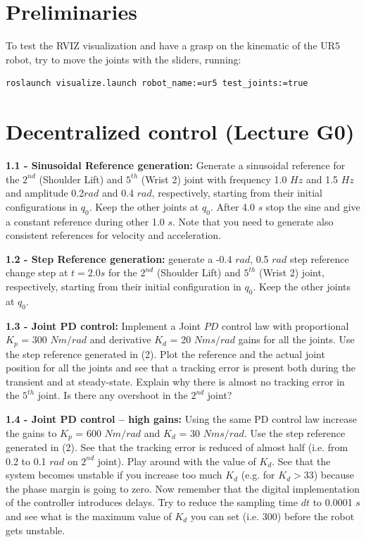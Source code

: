 \documentclass[11pt]{article}
\begin{document}
\section{Preliminaries}

To test the RVIZ visualization and have a grasp on the kinematic of the UR5 robot, try to move the joints with the sliders, running:
%
\begin{verbatim}
roslaunch visualize.launch robot_name:=ur5 test_joints:=true 
\end{verbatim}

\section{Decentralized control (Lecture G0)}

\noindent
\textbf{1.1 - Sinusoidal Reference generation:}
 Generate a sinusoidal reference for the $2^{nd}$ (Shoulder Lift) and $5^{th}$  (Wrist 2) joint with frequency 1.0 $Hz$ and 1.5 $Hz$ and amplitude 0.2$rad$ and 0.4 $rad$, respectively,  starting from their initial configurations in $q_0$. Keep the other joints at $q_0$. After 4.0 $s$ stop the sine and give a constant reference during other 1.0 $s$. Note that you need to generate also consistent references for velocity and acceleration.

\quad

\noindent
\textbf{1.2 - Step Reference generation:} generate a -0.4 $rad$, 0.5 $rad$ step reference change step at $t= 2.0s$ for the $2^{nd}$ (Shoulder Lift) and $5^{th}$  (Wrist 2) joint, respectively, starting from their initial configuration in $q_0$. Keep the other joints at $q_0$.

\quad

\noindent
\textbf{1.3 - Joint PD control:}
Implement a Joint $PD$ control law with proportional $K_p$ = 300 $Nm/rad$ and derivative $K_d$ = 20 $Nms/rad$ gains for all the joints. Use the step reference generated in (2). Plot the reference and the actual joint position for all the joints and see that a tracking error is present both during the transient and at steady-state. Explain why there is almost no tracking error in the $5^{th}$ joint. %
Is there any overshoot in the $2^{nd}$ joint? 

\quad

\noindent 
\textbf{1.4 - Joint PD control – high gains:}
Using the same PD control law increase the gains to $K_p$ = 600 $Nm/rad$ and $K_d$ = 30 $Nms/rad$.  Use the step reference generated in (2). See that the tracking 
error is reduced of almost half (i.e. from 0.2 to 0.1 $rad$ on $2^{nd}$ joint). Play around with the value of $K_d$. See that the system becomes unstable if you 
increase too much $K_d$ (e.g. for $K_d>33$)  because the phase margin is going to zero. Now remember that the digital implementation of the controller introduces delays. Try to reduce the sampling time $dt$ to 0.0001 $s$ and see what is the maximum value of $K_d$ you can set (i.e. 300) before the robot gets unstable.
\end{document}

